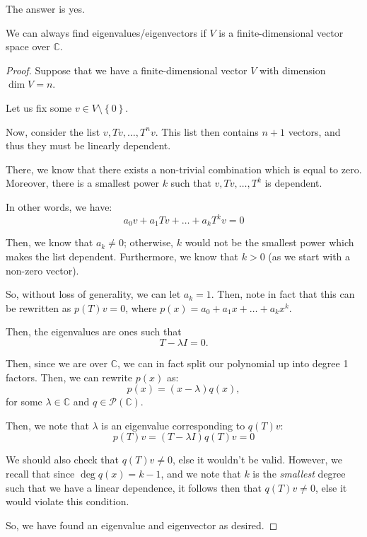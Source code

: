 \documentclass[openany]{book}
\newcommand{\CC}{\mathbb{C}}
\begin{document}
The answer is yes.
\begin{thm}
	We can always find eigenvalues/eigenvectors if $V$ is a finite-dimensional vector space over $\CC$.
\end{thm}
\begin{proof}
	Suppose that we have a finite-dimensional vector $V$ with dimension $\dim V = n$.
	
	Let us fix some $v \in V \setminus \left\{  0\right\}$.
	
	Now, consider the list $v, Tv, \ldots, T^{n}v$. This list then contains $n+1$ vectors, and thus they must be linearly dependent.
	
	There, we know that there exists a non-trivial combination which is equal to zero. Moreover, there is a smallest power $k$ such that $v, Tv, \ldots, T^{k}$ is dependent.
	
	In other words, we have:
	\begin{equation*}
		a_{0}v + a_{1}Tv + \ldots + a_{k}T^{k}v = 0
	\end{equation*}

	Then, we know that $a_{k} \neq 0$; otherwise, $k$ would not be the smallest power which makes the list dependent. Furthermore, we know that $k > 0$ (as we start with a non-zero vector).
	
	So, without loss of generality, we can let $a_{k} = 1$. Then, note in fact that this can be rewritten as $p(T)v = 0$, where $p(x) = a_{0} + a_{1}x + \ldots + a_{k}x^{k}$.
	
	Then, the eigenvalues are ones such that
	\begin{equation*}
		T - \lambda I = 0.
	\end{equation*}

	Then, since we are over $\CC$, we can in fact split our polynomial up into degree 1 factors. Then, we can rewrite $p(x)$ as:
	\begin{equation*}
		p(x) = (x-\lambda)q(x),
	\end{equation*}
	for some $\lambda \in \CC$ and $q \in \mathscr{P}(\CC)$.
	
	Then, we note that $\lambda$ is an eigenvalue corresponding to $q(T)v$:
	\begin{equation*}
		p(T)v = (T-\lambda I)q(T)v = 0
	\end{equation*}

	We should also check that $q(T)v \neq 0$, else it wouldn't be valid. However, we recall that since $\deg q(x) = k -1$, and we note that $k$ is the \textit{smallest} degree such that we have a linear dependence, it follows then that $q(T)v \neq 0$, else it would violate this condition.
	
	So, we have found an eigenvalue and eigenvector as desired.
\end{proof}
\end{document}
